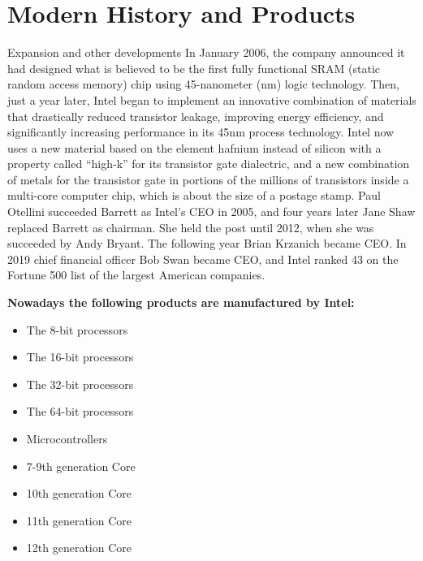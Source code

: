 \documentclass{beamer}
\begin{document}
\section{Modern History and Products}

\begin{frame}
\begin{block}{Expansion and other developments}
In January 2006, the company announced it had designed what is believed to be the first fully functional SRAM (static random access memory) chip using 45-nanometer (nm) logic technology. Then, just a year later, Intel began to implement an innovative combination of materials that drastically reduced transistor leakage, improving energy efficiency, and significantly increasing performance in its 45nm process technology. Intel now uses a new material based on the element hafnium instead of silicon with a property called “high-k” for its transistor gate dialectric, and a new combination of metals for the transistor gate in portions of the millions of transistors inside a multi-core computer chip, which is about the size of a postage stamp. Paul Otellini succeeded Barrett as Intel’s CEO in 2005, and four years later Jane Shaw replaced Barrett as chairman. She held the post until 2012, when she was succeeded by Andy Bryant. The following year Brian Krzanich became CEO. In 2019 chief financial officer Bob Swan became CEO, and Intel ranked 43 on the Fortune 500 list of the largest American companies.
\end{block}
\end{frame}

\begin{frame}
\textbf{Nowadays the following products are manufactured by Intel:}
\begin{itemize}
    \item The 8-bit processors
    \item The 16-bit processors
    \item The 32-bit processors
    \item The 64-bit processors
    \item Microcontrollers
    \item 7-9th generation Core
    \item 10th generation Core
    \item 11th generation Core
    \item 12th generation Core
\end{itemize}
\end{frame}
\end{document}
